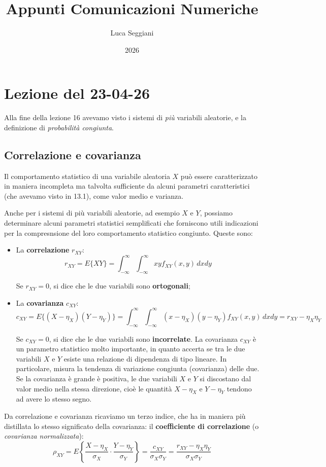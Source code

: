 \documentclass[a4paper,11pt]{article}
\title{Appunti Comunicazioni Numeriche}
\author{Luca Seggiani}
\date{2026}
\begin{document}
\section{Lezione del 23-04-26}

\thispagestyle{empty}
\pagestyle{fancy}

Alla fine della lezione 16 avevamo visto i sistemi di \textit{più} variabili aleatorie, e la definizione di \textit{probabilità congiunta}.

\subsection{Correlazione e covarianza}
Il comportamento statistico di una variabile aleatoria $X$ può essere caratterizzato in maniera incompleta ma talvolta sufficiente da alcuni parametri caratteristici (che avevamo visto in 13.1), come valor medio e varianza.

Anche per i sistemi di più variabili aleatorie, ad esempio $X$ e $Y$, possiamo determinare alcuni parametri statistici semplificati che forniscono utili indicazioni per la compresnsione del loro comportamento statistico congiunto. Queste sono:
\begin{itemize}
	\item La \textbf{correlazione} $r_{XY}$:
$$
r_{XY} = E \{ XY \} = \int_{-\infty}^{\infty} \int_{-\infty}^{\infty} x y f_{XY} (x, y) \, dx dy
$$

Se $r_{XY} = 0$, si dice che le due variabili sono \textbf{ortogonali};

\item La \textbf{covarianza} $c_{XY}$:
$$
	c_{XY} = E\{ (X - \eta_X) (Y - \eta_Y) \} = \int_{-\infty}^{\infty} \int_{-\infty}^{\infty} (x - \eta_X) (y - \eta_Y) f_{XY} (x, y) \, dx dy = r_{XY} - \eta_X \eta_Y
$$

Se $c_{XY} = 0$, si dice che le due variabili sono \textbf{incorrelate}.
La covarianza $c_{XY}$ è un parametro statistico molto importante, in quanto accerta se tra le due variabili $X$ e $Y$ esiste una relazione di dipendenza di tipo lineare. In particolare, misura la tendenza di variazione congiunta (covarianza) delle due. Se la covarianza è grande è positiva, le due variabili $X$ e $Y$ si discostano dal valor medio nella stessa direzione, cioè le quantità $X - \eta_X$ e $Y - \eta_Y$ tendono ad avere lo stesso segno.
\end{itemize}

Da correlazione e covarianza ricaviamo un terzo indice, che ha in maniera più distillata lo stesso significato della covarianza: il \textbf{coefficiente di correlazione} (o \textit{covarianza normalizzata}):
$$
\rho_{XY} = E \left\{ \frac{X - \eta_X}{\sigma_X} \cdot \frac{Y - \eta_Y}{\sigma_Y} \right\} = \frac{c_{XY}}{\sigma_X \sigma_Y} = \frac{r_{XY} - \eta_X \eta_Y}{\sigma_X \sigma_Y}
$$
\end{document}
